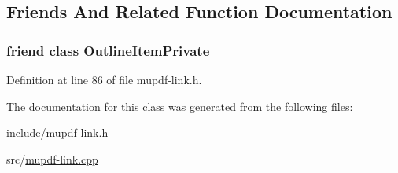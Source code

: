 \subsection{Friends And Related Function Documentation}
\hypertarget{class_mu_p_d_f_1_1_link_launch_ab008ed670017e41b6e6bba8707c775d2}{
\subsubsection[{Outline\-Item\-Private}]{\setlength{\rightskip}{0pt plus 5cm}friend class Outline\-Item\-Private\hspace{0.3cm}{\ttfamily [friend]}}}\label{class_mu_p_d_f_1_1_link_launch_ab008ed670017e41b6e6bba8707c775d2}


Definition at line 86 of file mupdf-\/link.\-h.



The documentation for this class was generated from the following files\-:\begin{DoxyCompactItemize}
\item 
include/\hyperlink{mupdf-link_8h}{mupdf-\/link.\-h}\item 
src/\hyperlink{mupdf-link_8cpp}{mupdf-\/link.\-cpp}\end{DoxyCompactItemize}
